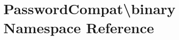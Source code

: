 \section{Password\+Compat\textbackslash{}binary Namespace Reference}
\label{namespace_password_compat_1_1binary}
